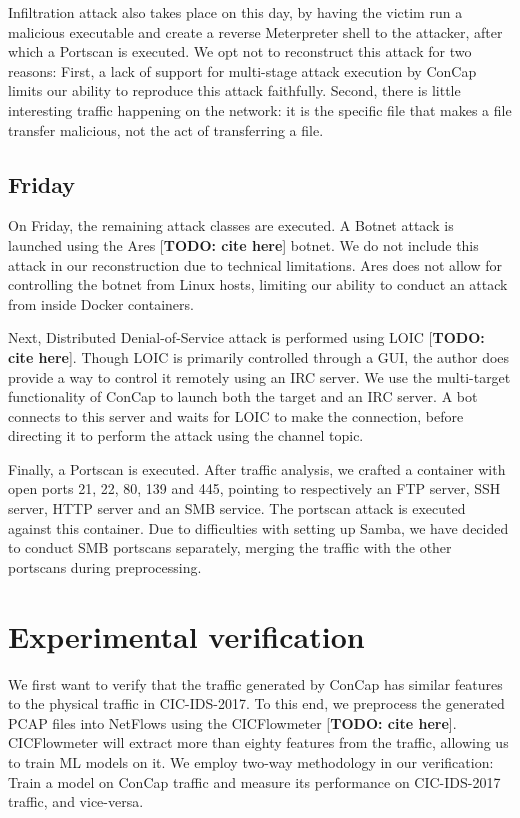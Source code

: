 \documentclass[conference]{IEEEtran}
\begin{document}
	Infiltration attack also takes place on this day, by having the victim run a malicious executable and create a reverse Meterpreter shell to the attacker, after which a Portscan is executed. We opt not to reconstruct this attack for two reasons: First, a lack of support for multi-stage attack execution by ConCap limits our ability to reproduce this attack faithfully. Second, there is little interesting traffic happening on the network: it is the specific file that makes a file transfer malicious, not the act of transferring a file. 
	
	\subsection{Friday}
	On Friday, the remaining attack classes are executed. 
	A Botnet attack is launched using the Ares [\textbf{TODO: cite here}] botnet. We do not include this attack in our reconstruction due to technical limitations. Ares does not allow for controlling the botnet from Linux hosts, limiting our ability to conduct an attack from inside Docker containers.
	
	Next, Distributed Denial-of-Service attack is performed using LOIC [\textbf{TODO: cite here}]. Though LOIC is primarily controlled through a GUI, the author does provide a way to control it remotely using an IRC server. We use the multi-target functionality of ConCap to launch both the target and an IRC server. A bot connects to this server and waits for LOIC to make the connection, before directing it to perform the attack using the channel topic.
	
	Finally, a Portscan is executed. After traffic analysis, we crafted a container with open ports 21, 22, 80, 139 and 445, pointing to respectively an FTP server, SSH server, HTTP server and an SMB service. The portscan attack is executed against this container. Due to difficulties with setting up Samba, we have decided to conduct SMB portscans separately, merging the traffic with the other portscans during preprocessing.

	
	\section{Experimental verification}\label{verification}
	
	We first want to verify that the traffic generated by ConCap has similar features to the physical traffic in CIC-IDS-2017. To this end, we preprocess the generated PCAP files into NetFlows using the CICFlowmeter [\textbf{TODO: cite here}]. CICFlowmeter will extract more than eighty features from the traffic, allowing us to train ML models on it. We employ two-way methodology in our verification: Train a model on ConCap traffic and measure its performance on CIC-IDS-2017 traffic, and vice-versa.
	
\end{document}
